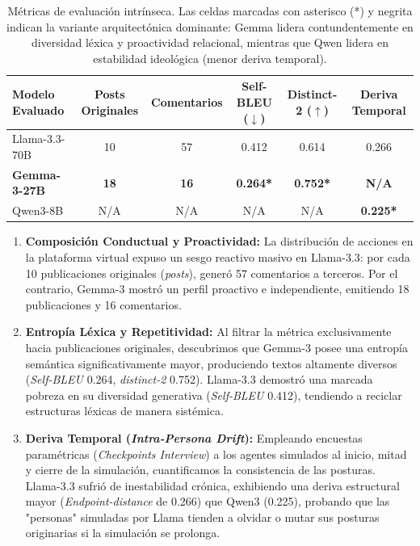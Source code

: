 \documentclass{article}
\begin{document}
\begin{table}[H]
    \centering
    \begin{tabular}{@{}lccccc@{}}
        \toprule
        \textbf{Modelo Evaluado} & \textbf{Posts Originales} & \textbf{Comentarios} & \textbf{Self-BLEU ($\downarrow$)} & \textbf{Distinct-2 ($\uparrow$)} & \textbf{Deriva Temporal} \\ \midrule
        Llama-3.3-70B & 10 & 57 & 0.412 & 0.614 & 0.266 \\
        \textbf{Gemma-3-27B} & \textbf{18} & \textbf{16} & \textbf{0.264*} & \textbf{0.752*} & \textbf{N/A} \\
        Qwen3-8B & N/A & N/A & N/A & N/A & \textbf{0.225*} \\ \bottomrule
    \end{tabular}
    \caption{Métricas de evaluación intrínseca. Las celdas marcadas con asterisco (*) y negrita indican la variante arquitectónica dominante: Gemma lidera contundentemente en diversidad léxica y proactividad relacional, mientras que Qwen lidera en estabilidad ideológica (menor deriva temporal).}
    \label{tab:analisis_intrinseco}
\end{table}

\begin{enumerate}
    \item \textbf{Composición Conductual y Proactividad:} La distribución de acciones en la plataforma virtual expuso un sesgo reactivo masivo en Llama-3.3: por cada 10 publicaciones originales (\textit{posts}), generó 57 comentarios a terceros. Por el contrario, Gemma-3 mostró un perfil proactivo e independiente, emitiendo 18 publicaciones y 16 comentarios.
    \item \textbf{Entropía Léxica y Repetitividad:} Al filtrar la métrica exclusivamente hacia publicaciones originales, descubrimos que Gemma-3 posee una entropía semántica significativamente mayor, produciendo textos altamente diversos (\textit{Self-BLEU} 0.264, \textit{distinct-2} 0.752). Llama-3.3 demostró una marcada pobreza en su diversidad generativa (\textit{Self-BLEU} 0.412), tendiendo a reciclar estructuras léxicas de manera sistémica.
    \item \textbf{Deriva Temporal (\textit{Intra-Persona Drift}):} Empleando encuestas paramétricas (\textit{Checkpoints Interview}) a los agentes simulados al inicio, mitad y cierre de la simulación, cuantificamos la consistencia de las posturas. Llama-3.3 sufrió de inestabilidad crónica, exhibiendo una deriva estructural mayor (\textit{Endpoint-distance} de 0.266) que Qwen3 (0.225), probando que las "personas" simuladas por Llama tienden a olvidar o mutar sus posturas originarias si la simulación se prolonga.
\end{enumerate}
\end{document}

